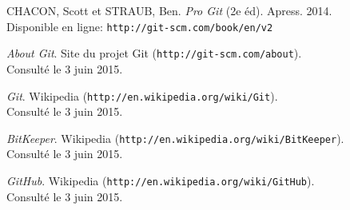 \documentclass[11pt,a4paper]{article}
\begin{document}
\begin{thebibliography}{1}

	CHACON, Scott et STRAUB, Ben. {\em Pro Git} (2e éd). Apress. 2014. \\
	Disponible en ligne: {\tt http://git-scm.com/book/en/v2}

	{\em About Git}. Site du projet Git ({\tt http://git-scm.com/about}). \\
	Consulté le 3 juin 2015.

	{\em Git}. Wikipedia ({\tt http://en.wikipedia.org/wiki/Git}). \\
	Consulté le 3 juin 2015.

	{\em BitKeeper}. Wikipedia ({\tt http://en.wikipedia.org/wiki/BitKeeper}). \\
	Consulté le 3 juin 2015.

	{\em GitHub}. Wikipedia ({\tt http://en.wikipedia.org/wiki/GitHub}). \\
	Consulté le 3 juin 2015.
	
\end{thebibliography}
\end{document}

